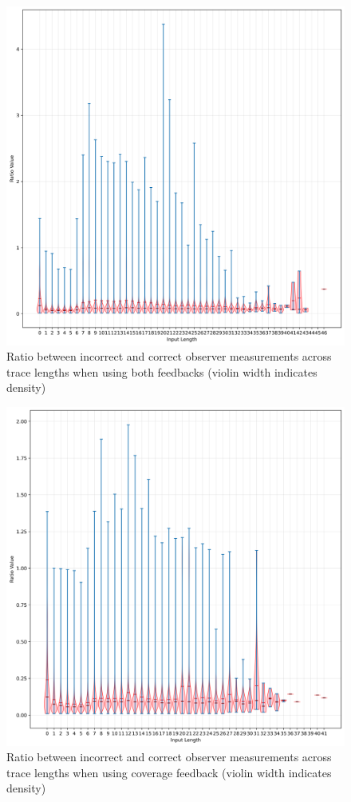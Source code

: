 \documentclass[twocolumn]{article}
\begin{document}
\begin{figure}
  \includegraphics[width=\columnwidth]{assets/consistency/both-violin.png}
  \caption{Ratio between incorrect and correct observer measurements across trace lengths when using both feedbacks (violin width indicates density)}
  \label{fig:both-inter-violin}
\end{figure}
\begin{figure}
  \includegraphics[width=\columnwidth]{assets/consistency/coverage-violin.png}
  \caption{Ratio between incorrect and correct observer measurements across trace lengths when using coverage feedback (violin width indicates density)}
  \label{fig:coverage-inter-violin}
\end{figure}
\end{document}
